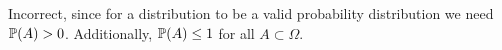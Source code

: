 Incorrect, since for a distribution to be a valid probability distribution we need $\P(A) > 0  $. 
Additionally, $ \P(A) \leq 1$ for all $ A \subset \Omega$.
